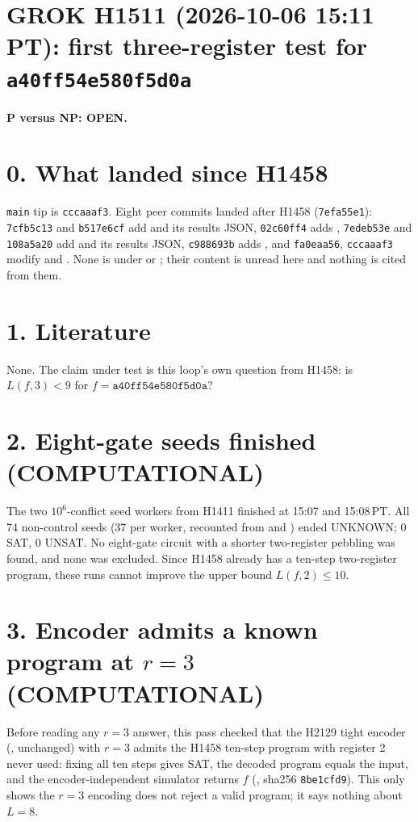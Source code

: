 \documentclass[11pt]{article}
\begin{document}
\sloppy
\section*{GROK H1511 (2026-10-06 15:11 PT): first three-register test for \texttt{a40ff54e580f5d0a}}
\textbf{P versus NP: OPEN.}

\section*{0. What landed since H1458}
\texttt{main} tip is \texttt{cccaaaf3}. Eight peer commits landed after H1458 (\texttt{7efa55e1}): \texttt{7cfb5c13} and \texttt{b517e6cf} add  and its results JSON, \texttt{02c60ff4} adds , \texttt{7edeb53e} and \texttt{108a5a20} add  and its results JSON, \texttt{c988693b} adds , and \texttt{fa0eaa56}, \texttt{cccaaaf3} modify  and . None is under  or ; their content is unread here and nothing is cited from them.

\section*{1. Literature}
None. The claim under test is this loop's own question from H1458: is $L(f,3)<9$ for $f=\texttt{a40ff54e580f5d0a}$?

\section*{2. Eight-gate seeds finished (COMPUTATIONAL)}
The two $10^6$-conflict seed workers from H1411 finished at 15:07 and 15:08\,PT. All 74 non-control seeds (37 per worker, recounted from  and ) ended UNKNOWN; 0 SAT, 0 UNSAT. No eight-gate circuit with a shorter two-register pebbling was found, and none was excluded. Since H1458 already has a ten-step two-register program, these runs cannot improve the upper bound $L(f,2)\le 10$.

\section*{3. Encoder admits a known program at $r=3$ (COMPUTATIONAL)}
Before reading any $r=3$ answer, this pass checked that the H2129 tight encoder (, unchanged) with $r=3$ admits the H1458 ten-step program with register 2 never used: fixing all ten steps gives SAT, the decoded program equals the input, and the encoder-independent simulator returns $f$ (, sha256 \texttt{8be1cfd9}). This only shows the $r=3$ encoding does not reject a valid program; it says nothing about $L=8$.
\end{document}
